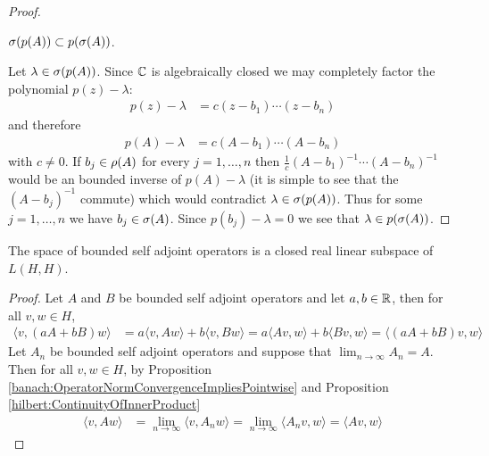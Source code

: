 \begin{proof}
\begin{clm} $\sigma(p(A))\subset p(\sigma(A))$.
\end{clm}
Let $\lambda \in \sigma(p(A))$.  Since $\mathbb{C}$ is algebraically closed we may completely factor the polynomial $p(z) - \lambda$:
\begin{align*}
p(z) - \lambda &= c(z - b_1) \dotsb (z -b_n)
\end{align*}
and therefore
\begin{align*}
p(A) - \lambda &= c(A - b_1) \dotsb (A -b_n)
\end{align*}
with $c \neq 0$.  If $b_j \in \rho(A)$ for every $j=1, \dotsc, n$ then $\frac{1}{c} (A - b_1)^{-1} \dotsb (A -b_n)^{-1}$ would be an bounded inverse of $p(A) - \lambda$ (it is simple to see that the $(A-b_j)^{-1}$ commute) which would contradict $\lambda \in \sigma(p(A))$.  Thus for some $j=1, \dotsc, n$ we have $b_j \in \sigma(A)$.  Since $p(b_j) - \lambda = 0$ we see that $\lambda \in p(\sigma(A))$.
\end{proof}

\begin{prop}\label{hilbert:BoundedSelfAdjointProperties}The space of bounded self adjoint operators is a closed real linear subspace of $L(H,H)$.
\end{prop}
\begin{proof}
Let $A$ and $B$ be bounded self adjoint operators and let $a, b \in \mathbb{R}$, then for all $v,w \in H$,
\begin{align*}
\langle v, (aA + bB) w \rangle &= a \langle v, Aw \rangle + b \langle v, B w \rangle =  a \langle A v, w \rangle + b \langle B v, w \rangle = \langle (aA+bB) v, w \rangle
\end{align*}
Let $A_n$ be bounded self adjoint operators and suppose that $\lim_{n \to \infty} A_n = A$.  Then for all $v, w \in H$, by Proposition \ref{banach:OperatorNormConvergenceImpliesPointwise} and 
Proposition \ref{hilbert:ContinuityOfInnerProduct}
\begin{align*}
\langle v, A w \rangle &= \lim_{n\to \infty} \langle v, A_n w \rangle = \lim_{n\to \infty} \langle A_n v, w \rangle = \langle A v, w \rangle
\end{align*}
\end{proof}

